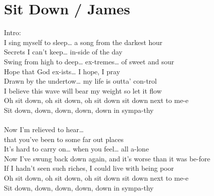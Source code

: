 \section{Sit Down / James}\label{sec:sitdown}

  \Amajor
  \DmajorEasy
  \FsharpMinor
  \Gmajor



Intro:      \\
I  sing myself to  sleep… a  song from the  darkest hour\\
 Secrets I can't  keep… in-side of the  day\\
 Swing from high to   deep… ex-tremes… of  sweet and sour\\
 Hope that God ex-ists… I  hope, I  pray\\
 Drawn by the  undertow… my  life is outta' con-trol\\
 I believe this  wave will bear my  weight so let it  flow\\
Oh sit  down, oh sit down, oh sit down  sit down next to  me-e\\
Sit  down, down, down, down, down  in sympa-thy\\
     \\
Now  I’m relieved to  hear…\\
that you've  been to some  far out places\\
It's  hard to carry   on… when you  feel… all a-lone\\
 Now I've swung back down again, and it's  worse than it was be-fore\\
If I  hadn't seen such riches, I could  live with being  poor\\
Oh sit  down, oh sit down, oh sit down  sit down next to  me-e\\
Sit  down, down, down, down, down  in sympa-thy\\
